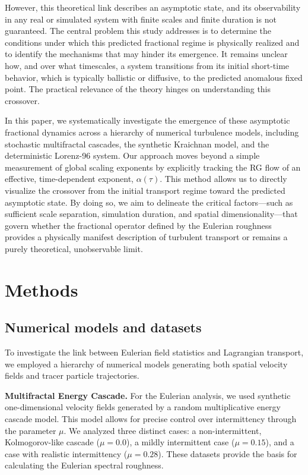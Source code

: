 \documentclass[]{article}
\begin{document}
However, this theoretical link describes an asymptotic state, and its observability in any real or simulated system with finite scales and finite duration is not guaranteed. The central problem this study addresses is to determine the conditions under which this predicted fractional regime is physically realized and to identify the mechanisms that may hinder its emergence. It remains unclear how, and over what timescales, a system transitions from its initial short-time behavior, which is typically ballistic or diffusive, to the predicted anomalous fixed point. The practical relevance of the theory hinges on understanding this crossover.

In this paper, we systematically investigate the emergence of these asymptotic fractional dynamics across a hierarchy of numerical turbulence models, including stochastic multifractal cascades, the synthetic Kraichnan model, and the deterministic Lorenz-96 system. Our approach moves beyond a simple measurement of global scaling exponents by explicitly tracking the RG flow of an effective, time-dependent exponent, $\alpha(\tau)$. This method allows us to directly visualize the crossover from the initial transport regime toward the predicted asymptotic state. By doing so, we aim to delineate the critical factors—such as sufficient scale separation, simulation duration, and spatial dimensionality—that govern whether the fractional operator defined by the Eulerian roughness provides a physically manifest description of turbulent transport or remains a purely theoretical, unobservable limit.

\section{Methods}
\label{sec:methods}
\subsection{Numerical models and datasets}
To investigate the link between Eulerian field statistics and Lagrangian transport, we employed a hierarchy of numerical models generating both spatial velocity fields and tracer particle trajectories.

\noindent\textbf{Multifractal Energy Cascade.} For the Eulerian analysis, we used synthetic one-dimensional velocity fields generated by a random multiplicative energy cascade model. This model allows for precise control over intermittency through the parameter $\mu$. We analyzed three distinct cases: a non-intermittent, Kolmogorov-like cascade ($\mu=0.0$), a mildly intermittent case ($\mu=0.15$), and a case with realistic intermittency ($\mu=0.28$). These datasets provide the basis for calculating the Eulerian spectral roughness.
\end{document}
